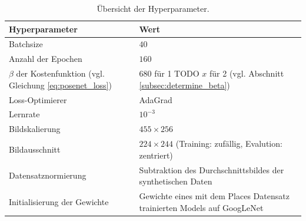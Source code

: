 \begin{table}[H]
	\centering
	\caption{Übersicht der Hyperparameter.}
	\begin{tabularx}{1.0\textwidth}{X X}
		\textbf{Hyperparameter} & \textbf{Wert}\\
		\hline
		Batchsize & $40$\\
		\hline
		Anzahl der Epochen & $160$\\
		\hline
		$\beta$ der Kostenfunktion (vgl. Gleichung \ref{eq:posenet_loss}) &
		\makecell[tl]{
			$680$ für 1 TODO\\
			$x$ für 2 (vgl. Abschnitt \ref{subsec:determine_beta})\\
		}\\
		\hline
		Loss-Optimierer & AdaGrad\\
		\hline
		Lernrate & $10^{-3}$\\
		\hline
		Bildskalierung & $455 \times 256$\\
		\hline
		Bildausschnitt& \makecell[tl]{
			$224 \times 244$\\
			(Training: zufällig, Evalution: zentriert)\\
		}\\
		\hline
		Datensatznormierung & Subtraktion des Durchschnittsbildes der synthetischen Daten \\
		\hline
		Initialisierung der Gewichte & Gewichte eines mit dem Places Datensatz trainierten Models auf GoogLeNet \\
	\end{tabularx}
	\label{tab:trainingparams}
\end{table}
